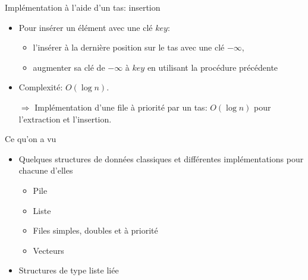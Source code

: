 \begin{frame}{Implémentation à l'aide d'un tas: insertion}
\begin{itemize}
\item Pour insérer un élément avec une clé $key$:
\begin{itemize}
\item l'insérer à la dernière position sur le tas avec une clé $-\infty$,
\item augmenter sa clé de $-\infty$ à $key$ en utilisant la procédure précédente
\end{itemize}

\bigskip

\begin{center}
\begin{small}
\end{small}
\end{center}

\bigskip

\item Complexité: $O(\log n)$.

\bigskip

\item[$\Rightarrow$] Implémentation d'une file à priorité par un tas: $O(\log n)$ pour l'extraction et l'insertion.
\end{itemize}
\note{}
\end{frame}

\begin{frame}{Ce qu'on a vu}

\begin{itemize}
\item Quelques structures de données classiques et différentes implémentations pour chacune d'elles
\begin{itemize}
\item Pile
\item Liste
\item Files simples, doubles et à priorité
\item Vecteurs
\end{itemize}
\item Structures de type liste liée
\end{itemize}

\end{frame}

